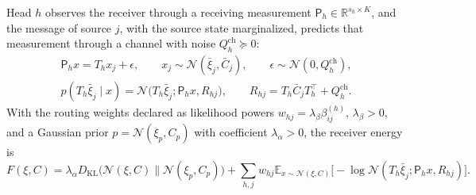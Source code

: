 \documentclass[twoside,11pt]{article}
\begin{document}
Head $h$ observes the receiver through a receiving measurement $\mathsf P_h\in\mathbb R^{s_h\times K}$, and the message of source $j$, with the source state marginalized, predicts that measurement through a channel with noise $Q_h^{\mathrm{ch}}\succeq0$:
\begin{equation}
\begin{gathered}
\mathsf P_hx=T_hx_j+\epsilon,\qquad x_j\sim\mathcal N(\bar\xi_j,\bar C_j),\qquad \epsilon\sim\mathcal N(0,Q_h^{\mathrm{ch}}),\\
p(T_h\bar\xi_j\mid x)=\mathcal N\bigl(T_h\bar\xi_j;\mathsf P_hx,R_{hj}\bigr),\qquad R_{hj}=T_h\bar C_jT_h^\top+Q_h^{\mathrm{ch}}.
\end{gathered}
\label{eq:rec_channel_model}
\end{equation}
With the routing weights declared as likelihood powers $w_{hj}=\lambda_\beta\beta_{ij}^{(h)}$, $\lambda_\beta>0$, and a Gaussian prior $p=\mathcal N(\xi_p,C_p)$ with coefficient $\lambda_\alpha>0$, the receiver energy is
\begin{equation}
F(\xi,C)=\lambda_\alpha D_{\mathrm{KL}}\bigl(\mathcal N(\xi,C)\|\mathcal N(\xi_p,C_p)\bigr)+\sum_{h,j}w_{hj}\mathbb E_{x\sim\mathcal N(\xi,C)}\bigl[-\log\mathcal N(T_h\bar\xi_j;\mathsf P_hx,R_{hj})\bigr].
\label{eq:rec_channel_energy}
\end{equation}
\end{document}
